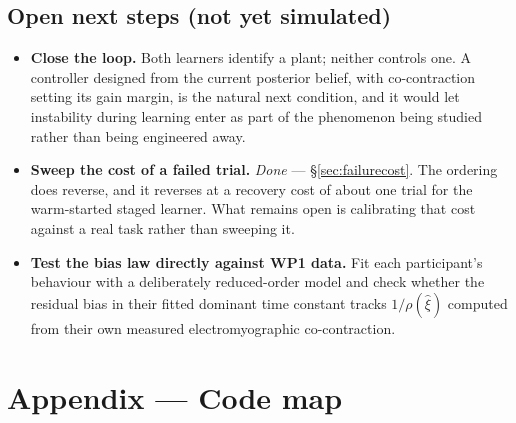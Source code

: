 \documentclass[11pt,a4paper]{article}
\begin{document}
\subsection{Open next steps (not yet simulated)}

\begin{itemize}[nosep]
\item \textbf{Close the loop.} Both learners identify a plant; neither
  controls one. A controller designed from the current posterior belief,
  with co-contraction setting its gain margin, is the natural next condition,
  and it would let instability during learning enter as part of the
  phenomenon being studied rather than being engineered away.
\item \textbf{Sweep the cost of a failed trial.} \emph{Done} ---
  \S\ref{sec:failurecost}. The ordering does reverse, and it reverses at a
  recovery cost of about one trial for the warm-started staged learner.
  What remains open is calibrating that cost against a real task rather
  than sweeping it.
\item \textbf{Test the bias law directly against WP1 data.} Fit each
  participant's behaviour with a deliberately reduced-order model and check
  whether the residual bias in their fitted dominant time constant tracks
  $1/\rho(\hat\xi)$ computed from their own measured electromyographic
  co-contraction.
\end{itemize}

\section{Appendix --- Code map}
\label{sec:code}
\end{document}

